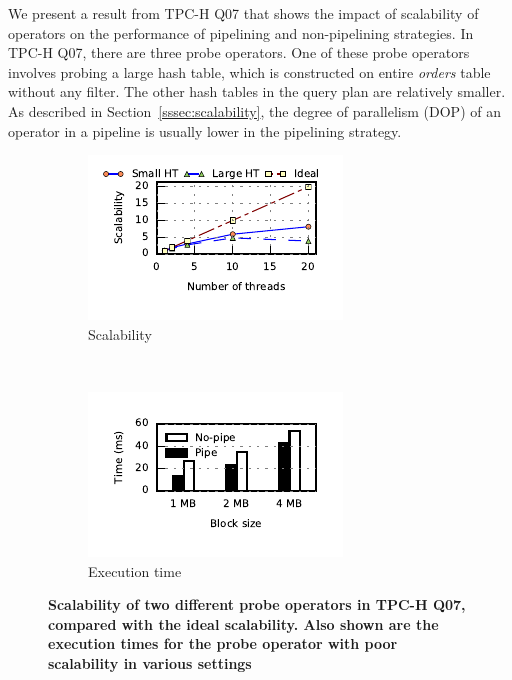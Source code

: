 We present a result from TPC-H Q07 that shows the impact of scalability of operators on the performance of pipelining and non-pipelining strategies.
In TPC-H Q07, there are three probe operators.
One of these probe operators involves probing a large hash table, which is constructed on entire \textit{orders} table without any filter.
The other hash tables in the query plan are relatively smaller. 
As described in Section~\ref{sssec:scalability}, the degree of parallelism (DOP) of an operator in a pipeline is usually lower in the pipelining strategy.

\begin{figure}[ht]
	\centering
	\begin{subfigure}[ht]{0.48\textwidth}
		\includegraphics[width=\textwidth]{pipeline/figures/tpch-q07-sf50-probe-scalability}	
		\caption{Scalability}
		\label{fig:scalability-tpch-q07}
	\end{subfigure}
	~
	\begin{subfigure}[ht]{0.48\textwidth}
		\includegraphics[width=\textwidth]{pipeline/figures/scalability-impact-tpchq07-op9-performance}	
		\caption{Execution time}		
		\label{fig:scalability-tpch-q07-exec-times}
	\end{subfigure}
	\caption{\textbf{Scalability of two different probe operators in TPC-H Q07, compared with the ideal scalability. Also shown are the execution times for the probe operator with poor scalability in various settings}}
	\label{fig:scalability-plots}
\end{figure}

